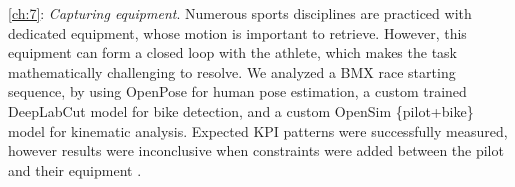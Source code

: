 \vskip 0.4cm
\noindent\autoref{ch:7}: \emph{Capturing equipment}. \newline
Numerous sports disciplines are practiced with dedicated equipment, whose motion is important to retrieve. However, this equipment can form a closed loop with the athlete, which makes the task mathematically challenging to resolve. We analyzed a BMX race starting sequence, by using OpenPose for human pose estimation, a custom trained DeepLabCut model for bike detection, and a custom OpenSim \{pilot+bike\} model for kinematic analysis. Expected KPI patterns were successfully measured, however results were inconclusive when constraints were added between the pilot and their equipment \cite{Pagnon2022e}.




